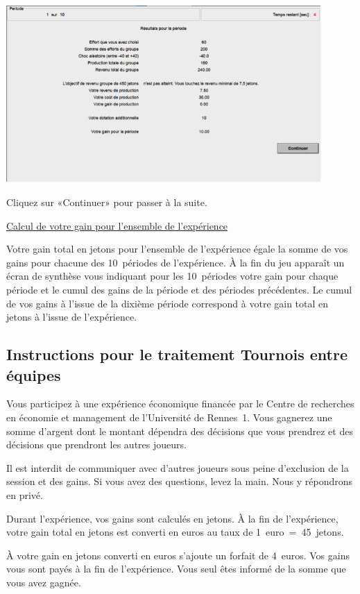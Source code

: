 \begin{Article}
\begin{refsection}[Lebourges]
\begin{appendices}
\includegraphics[width = 0.9\textwidth]{05_fig11-annexII.png}

Cliquez sur «Continuer» pour passer à la suite.

\vspace{.2cm}
\ul{Calcul de votre gain pour l'ensemble de l'expérience}

\vspace{.2cm}
Votre gain total en jetons pour l'ensemble de l'expérience égale la
somme de vos gains pour chacune des 10~périodes de l'expérience. À la
fin du jeu apparaît un écran de synthèse vous indiquant pour les
10~périodes votre gain pour chaque période et le cumul des gains de la
période et des périodes précédentes. Le cumul de vos gains à l'issue de
la dixième période correspond à votre gain total en jetons à l'issue de
l'expérience.

\subsection{Instructions pour le traitement Tournois entre équipes}

Vous participez à une expérience économique financée par le Centre de
recherches en économie et management de l'Université de Rennes~1. Vous
gagnerez une somme d'argent dont le montant dépendra des décisions que
vous prendrez et des décisions que prendront les autres joueurs.

Il est interdit de communiquer avec d'autres joueurs sous peine
d'exclusion de la session et des gains. Si vous avez des questions,
levez la main. Nous y répondrons en privé.

Durant l'expérience, vos gains sont calculés en jetons. À la fin de
l'expérience, votre gain total en jetons est converti en euros au taux
de 1~euro~=~45~jetons.

À votre gain en jetons converti en euros s'ajoute un forfait de 4~euros.
Vos gains vous sont payés à la fin de l'expérience. Vous seul êtes
informé de la somme que vous avez gagnée.


\end{appendices}
\end{refsection}
\end{Article}
